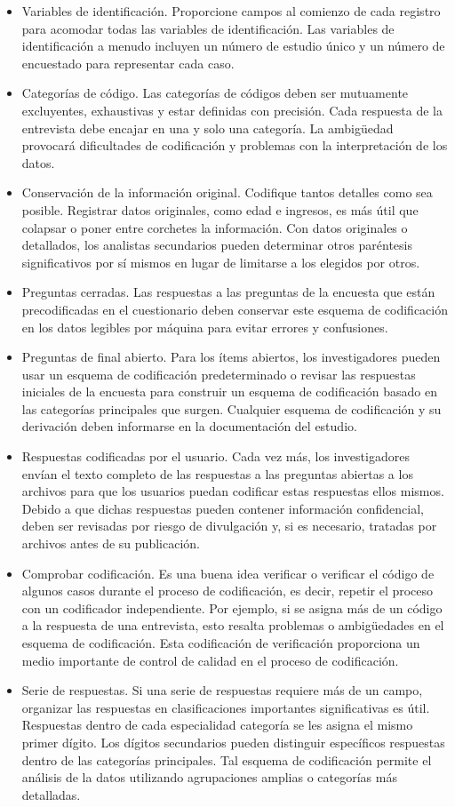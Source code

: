 \documentclass[
  14pt,
]{book}
\begin{document}
\begin{itemize}
\item
  Variables de identificación. Proporcione campos al comienzo de cada registro para acomodar todas las variables de identificación. Las variables de identificación a menudo incluyen un número de estudio único y un número de encuestado para representar cada caso.
\item
  Categorías de código. Las categorías de códigos deben ser mutuamente excluyentes, exhaustivas y estar definidas con precisión. Cada respuesta de la entrevista debe encajar en una y solo una categoría. La ambigüedad provocará dificultades de codificación y problemas con la interpretación de los datos.
\item
  Conservación de la información original. Codifique tantos detalles como sea posible. Registrar datos originales, como edad e ingresos, es más útil que colapsar o poner entre corchetes la información. Con datos originales o detallados, los analistas secundarios pueden determinar otros paréntesis significativos por sí mismos en lugar de limitarse a los elegidos por otros.
\item
  Preguntas cerradas. Las respuestas a las preguntas de la encuesta que están precodificadas en el cuestionario deben conservar este esquema de codificación en los datos legibles por máquina para evitar errores y confusiones.
\item
  Preguntas de final abierto. Para los ítems abiertos, los investigadores pueden usar un esquema de codificación predeterminado o revisar las respuestas iniciales de la encuesta para construir un esquema de codificación basado en las categorías principales que surgen. Cualquier esquema de codificación y su derivación deben informarse en la documentación del estudio.
\item
  Respuestas codificadas por el usuario. Cada vez más, los investigadores envían el texto completo de las respuestas a las preguntas abiertas a los archivos para que los usuarios puedan codificar estas respuestas ellos mismos. Debido a que dichas respuestas pueden contener información confidencial, deben ser revisadas por riesgo de divulgación y, si es necesario, tratadas por archivos antes de su publicación.
\item
  Comprobar codificación. Es una buena idea verificar o verificar el código de algunos casos durante el proceso de codificación, es decir, repetir el proceso con un codificador independiente. Por ejemplo, si se asigna más de un código a la respuesta de una entrevista, esto resalta problemas o ambigüedades en el esquema de codificación. Esta codificación de verificación proporciona un medio importante de control de calidad en el proceso de codificación.
\item
  Serie de respuestas. Si una serie de respuestas requiere más de un campo, organizar las respuestas en clasificaciones importantes significativas es útil. Respuestas dentro de cada especialidad categoría se les asigna el mismo primer dígito. Los dígitos secundarios pueden distinguir específicos respuestas dentro de las categorías principales. Tal esquema de codificación permite el análisis de la datos utilizando agrupaciones amplias o categorías más detalladas.
\end{itemize}
\end{document}
